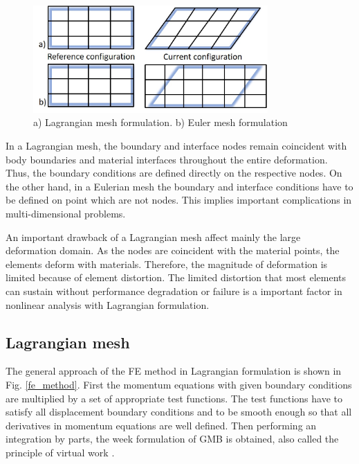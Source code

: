 \begin{figure}[!h]
\centering
\includegraphics[width=0.8\textwidth,keepaspectratio]{figures/lagrangian_mesh.jpg} 
\caption{a) Lagrangian mesh formulation. b) Euler mesh formulation}
\label{lagrangian_mesh}
\end{figure}
 

In a Lagrangian mesh, the boundary and interface nodes remain coincident with body boundaries and material interfaces throughout the entire deformation. Thus, the boundary conditions are defined directly on the respective nodes. On the other hand, in a Eulerian mesh the boundary and interface conditions have to be defined on point which are not nodes. This implies important complications in multi-dimensional problems.  

An important drawback of a Lagrangian mesh affect mainly the large deformation domain. As the nodes are coincident with the material points, the elements deform with materials. Therefore, the magnitude of deformation is limited because of element distortion. The limited distortion that most elements can sustain without performance degradation or failure is a important factor in nonlinear analysis with Lagrangian formulation. 
 

\subsection{Lagrangian mesh}\label{subsection:lagrangianmesh}

The general approach of the FE method in Lagrangian formulation is shown in Fig. \ref{fe_method}. First the momentum equations with given boundary conditions are multiplied by a set of appropriate test functions. The test functions have to satisfy all displacement boundary conditions and to be smooth enough so that all derivatives in momentum equations are well defined. Then performing an integration by parts, the week formulation of GMB is obtained, also called the principle of virtual work \citep{belytschko_nonlinear_2013}. 

